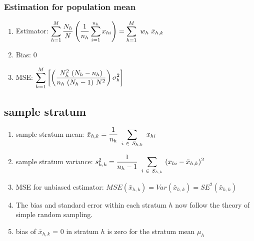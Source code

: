 \subsubsection{Estimation for population mean}
\begin{enumerate}
    \item Estimator: $
        \displaystyle\sum_{h=1}^{M}
        \dfrac{N_h}{N}
        \left(\dfrac{1}{n_h} \displaystyle\sum_{i=1}^{n_h} x_{hi}\right)
        =
        \displaystyle\sum_{h=1}^{M} \ w_h \ \bar{x}_{h,k}
    $
    \hfill \cite{statistics/book/Statistics-for-Data-Scientists/Maurits-Kaptein}
    
    \item Bias: $0$
    \hfill \cite{statistics/book/Statistics-for-Data-Scientists/Maurits-Kaptein}

    \item MSE: $
        \displaystyle\sum_{h=1}^{M}
        \left[
            \left(
                \dfrac{
                    N_h^2\ (N_h - n_h)
                }{
                    n_h\ (N_h-1)\ N^2
                }
            \right) \sigma_h^2
        \right]
    $
    \hfill \cite{statistics/book/Statistics-for-Data-Scientists/Maurits-Kaptein}
\end{enumerate}




\subsection{sample stratum}
\begin{enumerate}
    \item sample stratum mean: $
        \bar{x}_{h,k} = \dfrac{1}{n_h} \ \displaystyle\sum_{i \ \in \ S_{h,k}} \ x_{hi}
    $
    \hfill \cite{statistics/book/Statistics-for-Data-Scientists/Maurits-Kaptein}

    \item sample stratum variance: $
        s^2_{h,k} = \dfrac{1}{n_h-1} \ \displaystyle\sum_{i \ \in \ S_{h,k}} \ (x_{hi} - \bar{x}_{h,k})^2
    $
    \hfill \cite{statistics/book/Statistics-for-Data-Scientists/Maurits-Kaptein}

    \item MSE for unbiased estimator: 
    $
        MSE(\bar{x}_{h,k}) = Var(\bar{x}_{h,k}) = SE^2(\bar{x}_{h,k})
    $
    \hfill \cite{common/online/chatgpt}

    \item The bias and standard error within each stratum $h$ now follow the theory of simple random sampling.
    \hfill \cite{statistics/book/Statistics-for-Data-Scientists/Maurits-Kaptein}

    \item bias of $\bar{x}_{h,k}$ = 0 in stratum $h$ is zero for the stratum mean $\mu_h$

\end{enumerate}


